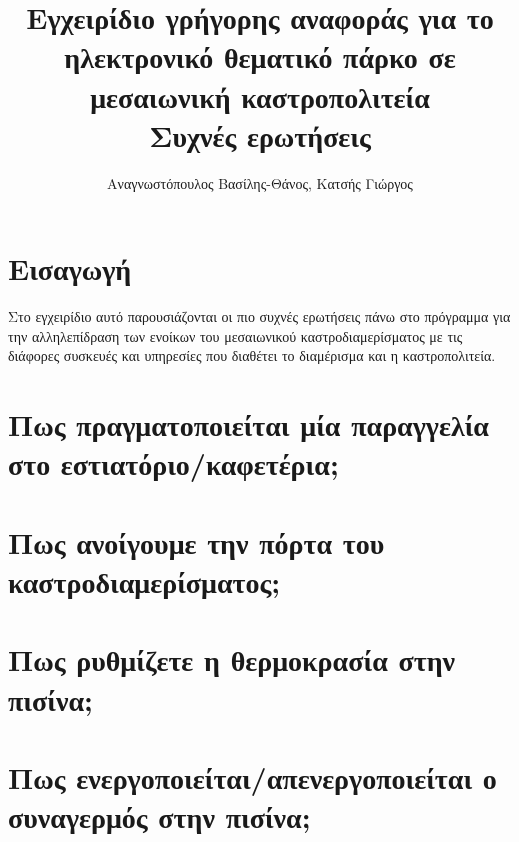 \documentclass[a4paper,titlepage,twoside,12pt,leqno]{article}
\title{Εγχειρίδιο γρήγορης αναφοράς για το ηλεκτρονικό θεματικό πάρκο σε μεσαιωνική καστροπολιτεία \\ Συχνές ερωτήσεις}
\author{Αναγνωστόπουλος Βασίλης-Θάνος, Κατσής Γιώργος}
\date{}
\begin{document}
\maketitle
\tableofcontents
\listoffigures
\listoftables
\newpage

\section{Εισαγωγή}


Στο εγχειρίδιο αυτό παρουσιάζονται οι πιο συχνές ερωτήσεις πάνω στο πρόγραμμα για την αλληλεπίδραση των ενοίκων του μεσαιωνικού καστροδιαμερίσματος με τις διάφορες συσκευές και υπηρεσίες που διαθέτει το διαμέρισμα και η καστροπολιτεία.

\section{Πως πραγματοποιείται μία παραγγελία στο εστιατόριο/καφετέρια;}

\section{Πως ανοίγουμε την πόρτα του καστροδιαμερίσματος;}

\section{Πως ρυθμίζετε η θερμοκρασία στην πισίνα;}

\section{Πως ενεργοποιείται/απενεργοποιείται ο συναγερμός στην πισίνα;}
\end{document}
